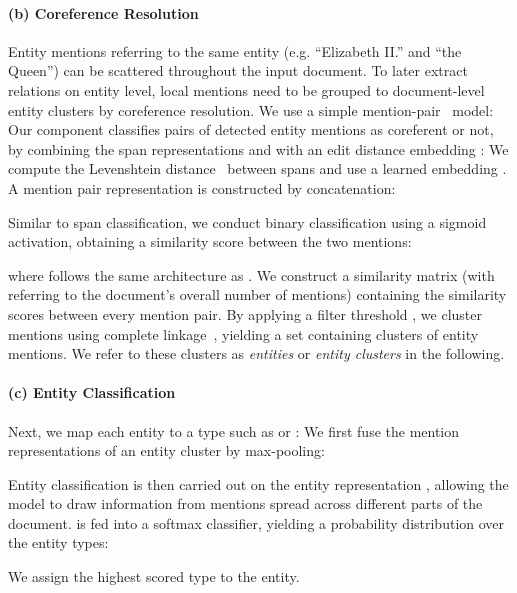 \documentclass[11pt,a4paper]{article}
\begin{document}
\paragraph{(b) Coreference Resolution} Entity mentions referring to the same entity (e.g. \enquote{Elizabeth II.} and \enquote{the Queen}) can be scattered throughout the input document. To later extract relations on entity level, local mentions need to be grouped to document-level entity clusters by coreference resolution. We use a simple mention-pair~\cite{soon:2001:coref_mention_pair} model: Our component classifies pairs  of detected entity mentions as coreferent or not, by combining
the span representations  and  with an edit distance embedding : We compute the Levenshtein distance~\cite{levenshtein:1966:levenshtein} between spans  and use a learned embedding .
A mention pair representation  is constructed by concatenation:

Similar to span classification, we conduct binary classification using a sigmoid activation, obtaining a similarity score between the two mentions: 

where  follows the same architecture as .
We construct a similarity matrix  (with  referring to the document's overall number of mentions) containing the similarity scores between every mention pair. By applying a filter threshold , we cluster mentions using complete linkage~\cite{muellner:2011:clustering}, yielding a set  containing clusters of entity mentions. We refer to these clusters as \emph{entities} or \emph{entity clusters} in the following.

\paragraph{(c) Entity Classification} Next, we map each entity to a type such as  or : We first fuse the mention representations of an entity cluster  by max-pooling:

Entity classification is then carried out on the entity representation , allowing the model to draw information from mentions spread across different parts of the document.  is fed into a softmax classifier, yielding a probability distribution over the entity types:

We assign the highest scored type to the entity.
\end{document}
